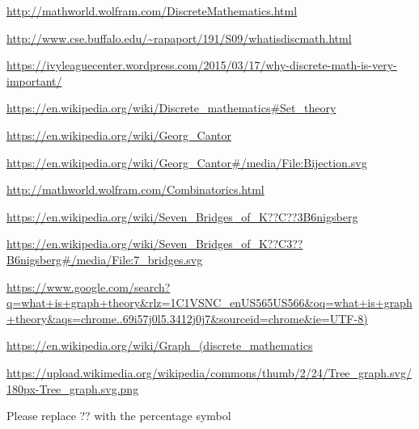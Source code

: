 \documentclass{amsart}
\theoremstyle{definition}
\theoremstyle{remark}
\numberwithin{equation}{section}
\begin{document}

\begin{thebibliography}{10}
\bibitem \url{http://mathworld.wolfram.com/DiscreteMathematics.html}

\bibitem \url{http://www.cse.buffalo.edu/~rapaport/191/S09/whatisdiscmath.html}

\bibitem \url{https://ivyleaguecenter.wordpress.com/2015/03/17/why-discrete-math-is-very-important/}

\bibitem \url{https://en.wikipedia.org/wiki/Discrete_mathematics#Set_theory}

\bibitem \url{https://en.wikipedia.org/wiki/Georg_Cantor}

\bibitem \url{https://en.wikipedia.org/wiki/Georg_Cantor#/media/File:Bijection.svg}

\bibitem \url{http://mathworld.wolfram.com/Combinatorics.html}

\bibitem \url{https://en.wikipedia.org/wiki/Seven_Bridges_of_K??C??3B6nigsberg}

\bibitem \url{https://en.wikipedia.org/wiki/Seven_Bridges_of_K??C3??B6nigsberg#/media/File:7_bridges.svg}

\bibitem \url{https://www.google.com/search?q=what+is+graph+theory&rlz=1C1VSNC_enUS565US566&oq=what+is+graph+theory&aqs=chrome..69i57j0l5.3412j0j7&sourceid=chrome&ie=UTF-8)}

\bibitem \url{https://en.wikipedia.org/wiki/Graph_(discrete_mathematics}

\bibitem \url{https://upload.wikimedia.org/wikipedia/commons/thumb/2/24/Tree_graph.svg/180px-Tree_graph.svg.png}

\end{thebibliography}
\newline
Please replace ?? with the percentage symbol
\end{document}
